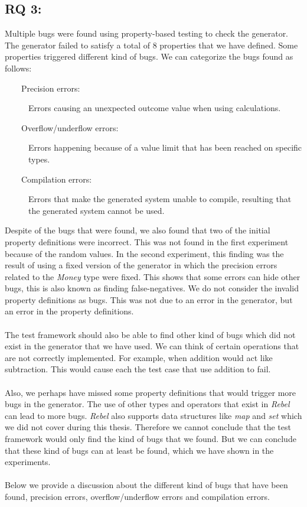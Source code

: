 \subsection*{RQ 3: \rqThree{}}
Multiple bugs were found using property-based testing to check the generator.
The generator failed to satisfy a total of 8 properties that we have defined.
Some properties triggered different kind of bugs. We can categorize the bugs found as follows:
\begin{description}
  \item[~~~~Precision errors:] Errors causing an unexpected outcome value when using calculations.
  \item[~~~~Overflow/underflow errors:] Errors happening because of a value limit that has been reached on specific types.
  \item[~~~~Compilation errors:] Errors that make the generated system unable to compile, resulting that the generated system cannot be used.
\end{description}
Despite of the bugs that were found, we also found that two of the initial property definitions were incorrect. This was not found in the first experiment because of the random values. In the second experiment, this finding was the result of using a fixed version of the generator in which the precision errors related to the \textit{Money} type were fixed. This shows that some errors can hide other bugs, this is also known as finding false-negatives. We do not consider the invalid property definitions as bugs. This was not due to an error in the generator, but an error in the property definitions.\\
\\
The test framework should also be able to find other kind of bugs which did not exist in the generator that we have used. We can think of certain operations that are not correctly implemented. For example, when addition would act like subtraction. This would cause each the test case that use addition to fail.\\
\\
Also, we perhaps have missed some property definitions that would trigger more bugs in the generator. The use of other types and operators that exist in \textit{Rebel} can lead to more bugs. \textit{Rebel} also supports data structures like \textit{map} and \textit{set} which we did not cover during this thesis. Therefore we cannot conclude that the test framework would only find the kind of bugs that we found. But we can conclude that these kind of bugs can at least be found, which we have shown in the experiments.\\
\\
Below we provide a discussion about the different kind of bugs that have been found, precision errors, overflow/underflow errors and compilation errors.

